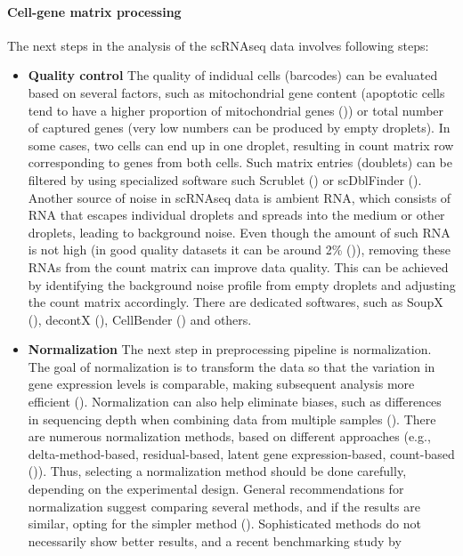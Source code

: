 \paragraph{Cell-gene matrix processing}

The next steps in the analysis of the scRNAseq data involves following steps:

\begin{itemize}
  \item \textbf{Quality control}
The quality of indidual cells (barcodes) can be evaluated based on several factors, such as mitochondrial gene content
(apoptotic cells tend to have a higher proportion of mitochondrial genes (\cite{Heumos2023})) or
total number of captured genes (very low numbers can be produced by empty droplets).
In some cases, two cells can end up in one droplet,
resulting in count matrix row corresponding to genes from  both cells.
Such matrix entries (doublets) can be filtered by using specialized software
such Scrublet (\cite{Wolock2019}) or scDblFinder (\cite{Germain2022}).
Another source of noise in scRNAseq data is ambient RNA,
which consists of RNA that escapes individual droplets and spreads into the medium or other droplets,
leading to background noise.
Even though the amount of such RNA is not high (in good quality datasets it can be around 2\% (\cite{Young2020})),
removing these RNAs from the count matrix can improve data quality.
This can be achieved by identifying the background noise profile from empty droplets and
adjusting the count matrix accordingly.
There are dedicated softwares,
such as SoupX (\cite{Young2020}), decontX (\cite{Yang2020}), CellBender (\cite{Fleming2023}) and others.
  \item \textbf{Normalization}
The next step in preprocessing pipeline is normalization.
The goal of normalization is to transform the data so that the variation in gene expression levels is comparable,
making subsequent analysis more efficient (\cite{Ahlmann2023}).
Normalization can also help eliminate biases,
such as differences in sequencing depth when combining data from multiple samples (\cite{Lingen2024}).
There are numerous normalization methods, based on different approaches
(e.g., delta-method-based, residual-based, latent gene expression-based, count-based (\cite{Ahlmann2023})).
Thus, selecting a normalization method should be done carefully, depending on the experimental design.
General recommendations for normalization suggest comparing several methods,
and if the results are similar, opting for the simpler method (\cite{Lingen2024}).
Sophisticated methods do not necessarily show better results, and a recent benchmarking study by \textcite{Ahlmann2023}

\end{itemize}
